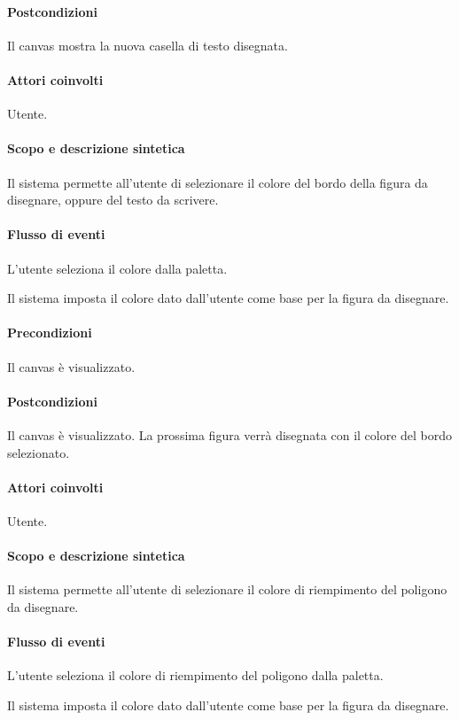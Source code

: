 \paragraph{Postcondizioni} Il canvas mostra la nuova casella di testo disegnata.

\paragraph{Attori coinvolti} Utente.
\paragraph{Scopo e descrizione sintetica} 
Il sistema permette all'utente di selezionare il colore del bordo della figura da disegnare, oppure del testo da scrivere.
\paragraph{Flusso di eventi}
\begin{elenconumerato}[\textbf{}]{\subsubsecindent}
\item L'utente seleziona il colore dalla paletta.
\item Il sistema imposta il colore dato dall'utente come base per la figura da disegnare.
\end{elenconumerato}
\paragraph{Precondizioni} Il canvas \`e visualizzato.
\paragraph{Postcondizioni} Il canvas \`e visualizzato. La prossima figura verr\` a disegnata con il colore del bordo selezionato.

\paragraph{Attori coinvolti} Utente.
\paragraph{Scopo e descrizione sintetica} 
Il sistema permette all'utente di selezionare il colore di riempimento del poligono da disegnare.
\paragraph{Flusso di eventi}
\begin{elenconumerato}[\textbf{}]{\subsubsecindent}
\item L'utente seleziona il colore di riempimento del poligono dalla paletta.
\item Il sistema imposta il colore dato dall'utente come base per la figura da disegnare.
\end{elenconumerato}
